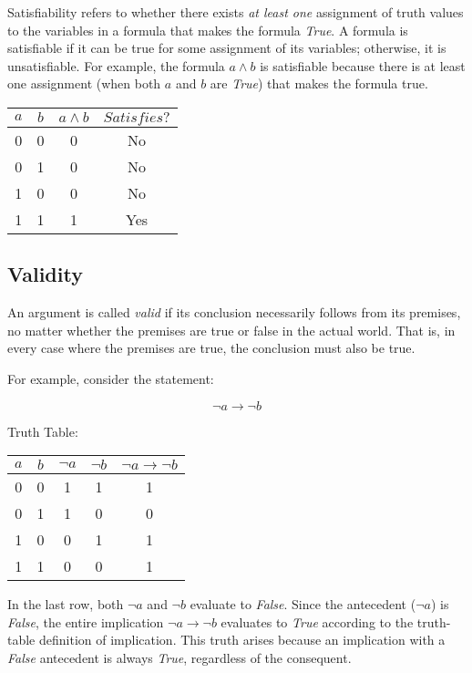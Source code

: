 \documentclass[12pt,a4paper,openany]{article}
\begin{document}
Satisfiability refers to whether there exists \emph{at least one}
assignment of truth values to the variables in a formula that makes the
formula \emph{True}. A formula is satisfiable if it can be true for some
assignment of its variables; otherwise, it is unsatisfiable. For
example, the formula \(a \land b\) is satisfiable because there is at
least one assignment (when both \(a\) and \(b\) are \emph{True}) that
makes the formula true.

\begin{center}
\begin{tabular}{|c|c|c|c|}
\hline
\(a\) & \(b\) & \(a \land b\) & \(Satisfies?\) \\
\hline
0 & 0 & 0 & No \\
0 & 1 & 0 & No \\
1 & 0 & 0 & No \\
1 & 1 & 1 & Yes \\
\hline
\end{tabular}
\end{center}

\subsection{Validity}\label{validity}

An argument is called \emph{valid} if its conclusion necessarily follows
from its premises, no matter whether the premises are true or false in
the actual world. That is, in every case where the premises are true,
the conclusion must also be true.

For example, consider the statement:

\[
\neg a \to \neg b
\]

Truth Table:

\begin{center}
\begin{tabular}{|c|c|c|c|c|}
\hline
\(a\) & \(b\) & \(\neg a\) & \(\neg b\) & \(\neg a \to \neg b\) \\
\hline
0 & 0 & 1 & 1 & 1 \\
0 & 1 & 1 & 0 & 0 \\
1 & 0 & 0 & 1 & 1 \\
1 & 1 & 0 & 0 & 1 \\
\hline
\end{tabular}
\end{center}

In the last row, both \(\neg a\) and \(\neg b\) evaluate to
\emph{False}. Since the antecedent (\(\neg a\)) is \emph{False}, the
entire implication \(\neg a \to \neg b\) evaluates to \emph{True}
according to the truth-table definition of implication. This truth
arises because an implication with a \emph{False} antecedent is always
\emph{True}, regardless of the consequent.
\end{document}
